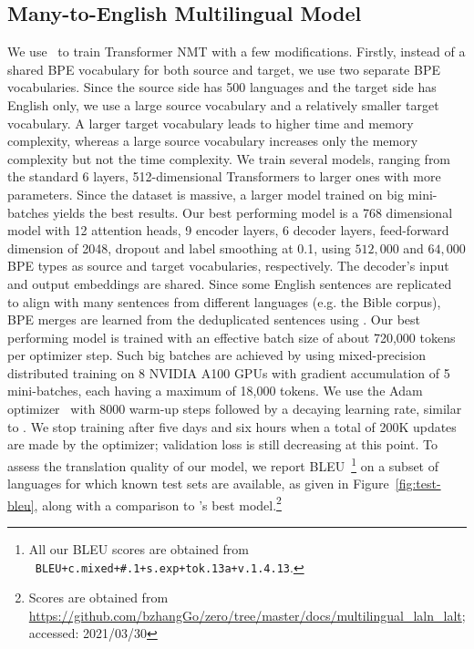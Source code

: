 \subsection{Many-to-English Multilingual Model}
\label{sec:500eng-model}
We use \rtg\ to train Transformer NMT \cite{vaswani-2017-attention} with a few modifications.
Firstly, instead of a shared BPE vocabulary for both source and target, we use two separate BPE vocabularies. 
Since the source side has 500 languages and the target side has English only, we use a large source vocabulary and a relatively smaller target vocabulary.
A larger target vocabulary leads to higher time and memory complexity, whereas a large source vocabulary increases only the memory complexity but not the time complexity.
We train several models, ranging from the standard 6 layers, 512-dimensional Transformers to larger ones with more parameters. Since the dataset is massive, a larger model trained on big mini-batches yields the best results. Our best performing model is a 768 dimensional model with 12 attention heads, 9 encoder layers, 6 decoder layers, feed-forward dimension of 2048, dropout and label smoothing at 0.1, using $512,000$ and $64,000$ BPE types as source and target vocabularies, respectively. The decoder's input and output embeddings are shared.
Since some English sentences are replicated to align with many sentences from different languages (e.g. the Bible corpus), BPE merges are learned from the deduplicated sentences using \nlcodec.
Our best performing model is trained with an effective batch size of about 720,000 tokens per optimizer step. Such big batches are achieved by using mixed-precision distributed training on 8 NVIDIA A100 GPUs with gradient accumulation of 5 mini-batches, each having a maximum of 18,000 tokens. We use the Adam optimizer~\cite{kingma2015adam} with 8000 warm-up steps followed by a decaying learning rate, similar to \citet{vaswani-2017-attention}. 
We stop training after five days and six hours when a total of 200K updates are made by the optimizer; validation loss is still decreasing at this point. 
To assess the translation quality of our model, we report BLEU~\cite{papineni-etal-2002-bleu,post-2018-sacrebleu}\footnote{All our BLEU scores are obtained from \sacrebleu\ \texttt{BLEU+c.mixed+\#.1+s.exp+tok.13a+v.1.4.13}.} on a subset of languages for which known test sets are available, as given in Figure~\ref{fig:test-bleu}, along with a comparison to \citet{zhang-etal-2020-multiling-nmt}'s best model.\footnote{
Scores are obtained from \url{https://github.com/bzhangGo/zero/tree/master/docs/multilingual_laln_lalt}; accessed: 2021/03/30}

